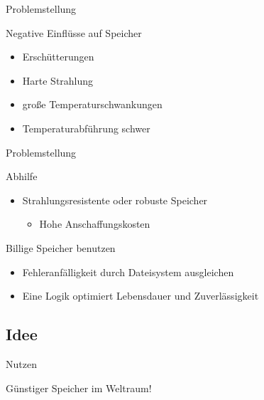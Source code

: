 \documentclass[
	,footlinenumber
	,navline=true
	,footlineauthor
	,ngerman
	]{beamer}
\begin{document}
\begin{frame}{Problemstellung}
\begin{block}{Negative Einflüsse auf Speicher}
\begin{itemize}
\item Erschütterungen
\item Harte Strahlung
\item große Temperaturschwankungen
\item Temperaturabführung schwer
\end{itemize}
\end{block}

\end{frame}

\begin{frame}{Problemstellung}
\begin{block}{Abhilfe}
\begin{itemize}
\item Strahlungsresistente oder robuste Speicher
	\begin{itemize}
	\item<alert@1-> Hohe Anschaffungskosten
	\end{itemize}
\end{itemize}
\end{block}
\begin{block}{Billige Speicher benutzen}
\begin{itemize}
\item Fehleranfälligkeit durch Dateisystem ausgleichen
\item Eine Logik optimiert Lebensdauer und Zuverlässigkeit
\end{itemize}
\end{block}

\end{frame}

\subsection{Idee}

\begin{frame}{Nutzen}
\begin{center}
Günstiger Speicher im Weltraum!
\end{center}
\end{frame}
\end{document}
